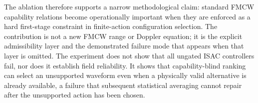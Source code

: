 
\figPaperOneGateAblation

The ablation therefore supports a narrow methodological claim: standard FMCW capability relations become operationally important when they are enforced as a hard first-stage constraint in finite-action configuration selection. The contribution is not a new FMCW range or Doppler equation; it is the explicit admissibility layer and the demonstrated failure mode that appears when that layer is omitted. The experiment does not show that all ungated ISAC controllers fail, nor does it establish field reliability. It shows that capability-blind ranking can select an unsupported waveform even when a physically valid alternative is already available, a failure that subsequent statistical averaging cannot repair after the unsupported action has been chosen.
